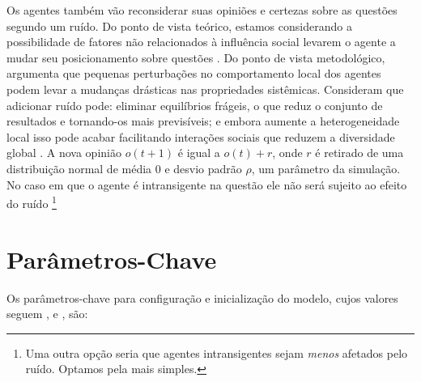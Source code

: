 Os agentes também vão reconsiderar suas opiniões e certezas sobre as questões
segundo um ruído. Do ponto de vista teórico, estamos considerando a
possibilidade de fatores não relacionados à influência social levarem o agente a
mudar seu posicionamento sobre questões \cite{flache2017, lorenz2017modeling}.
Do ponto de vista metodológico,  argumenta que
pequenas perturbações no comportamento local dos agentes podem levar a mudanças
drásticas nas propriedades sistêmicas. Consideram que adicionar ruído pode:
eliminar equilíbrios frágeis, o que reduz o conjunto de resultados e tornando-os
mais previsíveis; e embora aumente a heterogeneidade local isso pode acabar
facilitando interações sociais que reduzem a diversidade global
\cite[p.323]{macy2015signal}. A nova opinião \(o(t+1)\) é igual a \(o(t) + r\),
onde \(r\) é retirado de uma distribuição normal de média 0 e desvio padrão
\(\rho\), um parâmetro da simulação. No caso em que o agente é intransigente na
questão ele não será sujeito ao efeito do ruído \footnote{Uma outra opção seria
  que agentes intransigentes sejam \textit{menos} afetados pelo ruído. Optamos
  pela mais simples.}


\section{Parâmetros-Chave}

Os parâmetros-chave para configuração e inicialização do modelo, cujos valores
seguem ,  e
, são:

